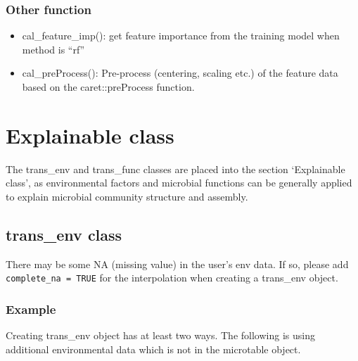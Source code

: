 \documentclass[
]{book}
\newenvironment{Shaded}{\begin{snugshade}}{\end{snugshade}}
\newcommand{\AttributeTok}[1]{\textcolor[rgb]{0.77,0.63,0.00}{#1}}
\newcommand{\CommentTok}[1]{\textcolor[rgb]{0.56,0.35,0.01}{\textit{#1}}}
\newcommand{\DecValTok}[1]{\textcolor[rgb]{0.00,0.00,0.81}{#1}}
\newcommand{\FunctionTok}[1]{\textcolor[rgb]{0.00,0.00,0.00}{#1}}
\newcommand{\NormalTok}[1]{#1}
\newcommand{\OtherTok}[1]{\textcolor[rgb]{0.56,0.35,0.01}{#1}}
\newcommand{\SpecialCharTok}[1]{\textcolor[rgb]{0.00,0.00,0.00}{#1}}
\providecommand{\tightlist}{%
  \setlength{\itemsep}{0pt}\setlength{\parskip}{0pt}}
\begin{document}
\hypertarget{other-function-1}{%
\subsection{Other function}\label{other-function-1}}

\begin{itemize}
\tightlist
\item
  cal\_feature\_imp(): get feature importance from the training model when method is ``rf''
\item
  cal\_preProcess(): Pre-process (centering, scaling etc.) of the feature data based on the caret::preProcess function.
\end{itemize}

\hypertarget{explainable-class}{%
\chapter{Explainable class}\label{explainable-class}}

The trans\_env and trans\_func classes are placed into the section `Explainable class',
as environmental factors and microbial functions can be generally applied to explain microbial community structure and assembly.

\hypertarget{trans_env-class}{%
\section{trans\_env class}\label{trans_env-class}}

There may be some NA (missing value) in the user's env data.
If so, please add \texttt{complete\_na\ =\ TRUE} for the interpolation when creating a trans\_env object.

\hypertarget{example-7}{%
\subsection{Example}\label{example-7}}

Creating trans\_env object has at least two ways.
The following is using additional environmental data which is not in the microtable object.

\begin{Shaded}
\end{Shaded}
\end{document}
